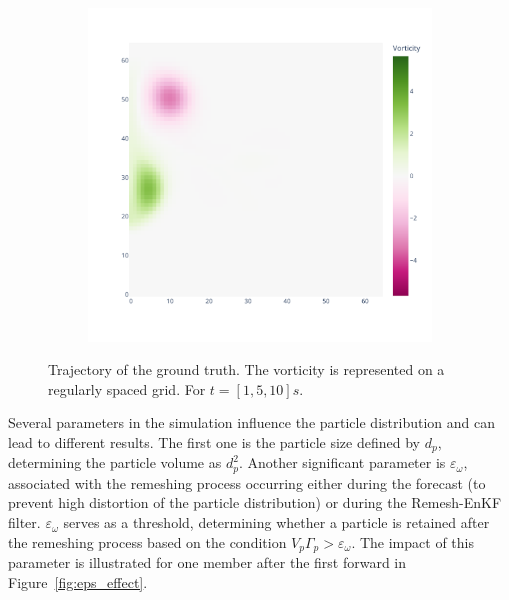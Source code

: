 \begin{figure}[htbp]
\begin{subfigure}{0.32\textwidth}
	\end{subfigure}
	\hfill
	\begin{subfigure}{0.32\textwidth}
		\includegraphics[width=\linewidth]{images/app2d/best_estimate_20.pdf}
	\end{subfigure}
	\caption{Trajectory of the ground truth. The vorticity is represented on a regularly spaced grid. For $t=[1, 5, 10]s.$}
	\label{fig:ref_trajectory}
\end{figure}
Several parameters in the simulation influence the particle distribution and can lead to different results. The first one is the particle size defined by $d_p$, determining the particle volume as $d_p^2$. Another significant parameter is $\varepsilon_\omega$, associated with the remeshing process occurring either during the forecast (to prevent high distortion of the particle distribution) or during the Remesh-EnKF filter. $\varepsilon_\omega$ serves as a threshold, determining whether a particle is retained after the remeshing process based on the condition $V_p \Gamma_p > \varepsilon_\omega$. The impact of this parameter is illustrated for one member after the first forward in Figure~\ref{fig:eps_effect}.

